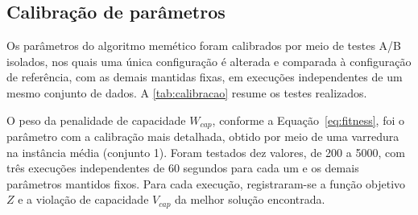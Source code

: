 \subsection{Calibração de parâmetros}
\label{sec:calibracao}

Os parâmetros do algoritmo memético foram calibrados por meio de testes A/B isolados, nos quais uma única configuração é alterada e comparada à configuração de referência, com as demais mantidas fixas, em execuções independentes de um mesmo conjunto de dados. A \autoref{tab:calibracao} resume os testes realizados.





O peso da penalidade de capacidade $W_{cap}$, conforme a Equação~\eqref{eq:fitness}, foi o parâmetro com a calibração mais detalhada, obtido por meio de uma varredura na instância média (conjunto 1). Foram testados dez valores, de 200 a 5000, com três execuções independentes de 60 segundos para cada um e os demais parâmetros mantidos fixos. Para cada execução, registraram-se a função objetivo $Z$ e a violação de capacidade $V_{cap}$ da melhor solução encontrada.

